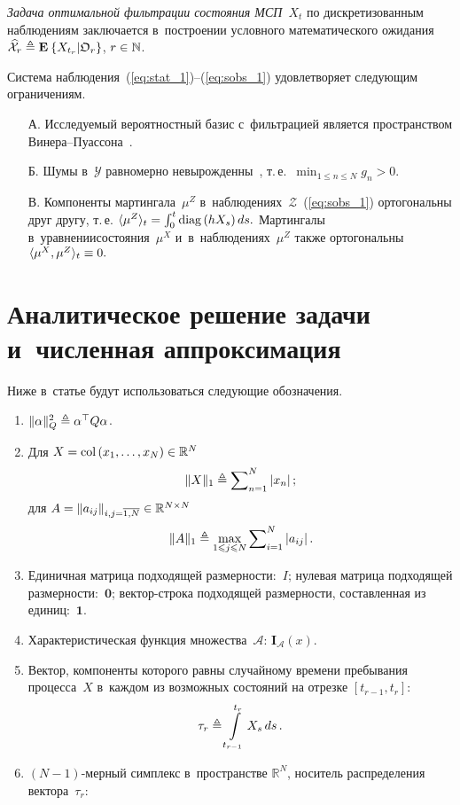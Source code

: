 \begin{multicols}{2}
\textit{Задача оптимальной фильтрации состояния МСП}~$X_t$ по дискретизованным 
наблюдениям заключается в~по\-стро\-ении услов\-но\-го математического ожидания  
$\widehat{\mathcal{X}}_r \hm\ebd \me{}{X_{t_r}|\mathfrak{O}_r}$, $r \hm\in 
\mathbb{N}$.

Система наблюдения~(\ref{eq:stat_1})--(\ref{eq:sobs_1}) удовлетворяет сле\-ду\-ющим 
ограничениям.
\begin{itemize}
   \item[А.]
  Исследуемый вероятностный базис с~фильт\-ра\-ци\-ей является пространством Ви\-не\-ра--Пу\-ас\-со\-на~\cite{IK_06}.
  \item[Б.]
  Шумы в~$\mathcal{Y}$ равномерно не\-вы\-рож\-ден\-ны~\cite{LSh_1_01}, т.\,е.\
  $\min\nolimits_{1 \leqslant n \leqslant N }g_n > 0$.
  \item[В.] Компоненты мартингала~$\mu^{Z}$ в~наблюдениях~$\mathcal{Z}$~(\ref{eq:sobs_1}) ортогональны друг другу, т.\,е.
    $\langle  \mu^Z   \rangle_t \hm= \int\nolimits_0^t \mathrm{diag}\left( h X_s\right)ds.$
  Мартингалы в~уравнении\linebreak со\-сто\-яния~$\mu^{X}$ и~в~наблюдениях~$\mu^{Z}$ так\-же 
ортогональны   $\langle \mu^X,\mu^Z \rangle_t \hm\equiv 0.$
\end{itemize}

\section{Аналитическое решение задачи и~численная аппроксимация}

Ниже в~статье будут использоваться сле\-ду\-ющие обозначения.
\begin{enumerate}[1.]
 \item
  $\|\alpha\|^2_{Q} \triangleq \alpha^{\top}Q\alpha$.
 
  \item Для $X = \col\,(x_1,\ldots,x_N)\hm \in \mathbb{R}^N$  
  $$
  \|X\|_1 \hm\ebd 
\sum\nolimits_{n=1}^N |x_n|\,;
$$
 для $A\hm=\|a_{ij}\|_{i,j=\overline{1,N}} \hm\in 
\mathbb{R}^{N\times N}$  
$$
\|A\|_1 \hm\ebd \max_{1 \leqslant j \leqslant N} 
\sum\nolimits_{i=1}^N |a_{ij}|\,.
$$
  \item
  Единичная матрица подходящей раз\-мер\-ности:~$I$;
  нулевая мат\-ри\-ца подходящей раз\-мер\-ности:~$\mathbf{0}$;
  век\-тор-стро\-ка подходящей раз\-мер\-ности, со\-став\-лен\-ная из единиц:~$\mathbf{1}$.
  \item
   Характеристическая функция множества~$\mathcal{A}$: $\mathbf{I}_{\mathcal{A}}(x)$.
 \item
 Вектор, компоненты которого равны 
случайному времени пребывания процесса~$X$ в~каж\-дом из воз\-мож\-ных со\-сто\-яний на  
отрезке $[t_{r-1}, t_{r}]$:
$$
\tau_r \triangleq \int\limits_{t_{r-1}}^{t_{r}} X_s\,ds\,.
$$
  \item
  $(N-1)$-мер\-ный симплекс в~пространстве 
$\mathbb{R}^N$, носитель распределения век\-то\-ра~$\tau_r$:


\end{enumerate}
\end{multicols}
